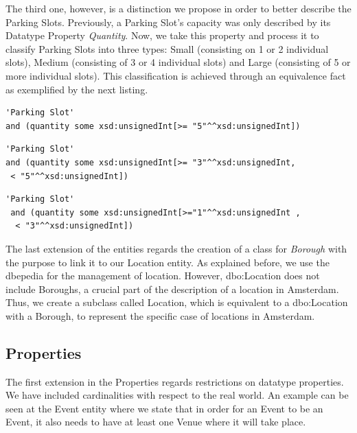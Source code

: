 \documentclass[runningheads,a4paper]{../../StyleFiles/llncs}
\begin{document}
The third one, however, is a distinction we propose in order to better describe the Parking Slots. Previously, a Parking Slot's capacity was only described by its Datatype Property \textit{Quantity}. Now, we take this property and process it to classify Parking Slots into three types: Small (consisting on 1 or 2 individual slots), Medium (consisting of 3 or 4 individual slots) and Large (consisting of 5 or more individual slots). This classification is achieved through an equivalence fact as exemplified by the next listing. \\

\begin{lstlisting}[captionpos=b, caption=Definition of Large Slot a subclass of Parking Slot, label=lst:owl, basicstyle=\ttfamily\small,frame=bt,showstringspaces=false]
'Parking Slot' 
and (quantity some xsd:unsignedInt[>= "5"^^xsd:unsignedInt])
\end{lstlisting}


\begin{lstlisting}[captionpos=b, caption=Definition of Medium Slot a subclass of Parking Slot, label=lst:owl, basicstyle=\ttfamily\small,frame=bt,showstringspaces=false]
'Parking Slot' 
and (quantity some xsd:unsignedInt[>= "3"^^xsd:unsignedInt,
 < "5"^^xsd:unsignedInt])
\end{lstlisting}

\begin{lstlisting}[captionpos=b, caption=Definition of Small Slot a subclass of Parking Slot, label=lst:owl, basicstyle=\ttfamily\small,frame=bt,showstringspaces=false]
'Parking Slot' 
 and (quantity some xsd:unsignedInt[>="1"^^xsd:unsignedInt ,
  < "3"^^xsd:unsignedInt])
\end{lstlisting}

The last extension of the entities regards the creation of a class for \textit{Borough} with the purpose to link it to our Location entity. As explained before, we use the dbepedia for the management of location. However, dbo:Location does not include Boroughs, a crucial part of the description of a  location in Amsterdam. Thus, we create a subclass called Location, which is equivalent to a dbo:Location with a Borough, to represent the specific case of locations in Amsterdam.

\subsection{Properties}

The first extension in the Properties regards restrictions on datatype properties. We have included cardinalities with respect to the real world. An example can be seen at the Event entity where we state that in order for an Event to be an Event, it also needs to have at least one Venue where it will take place.
\end{document}
